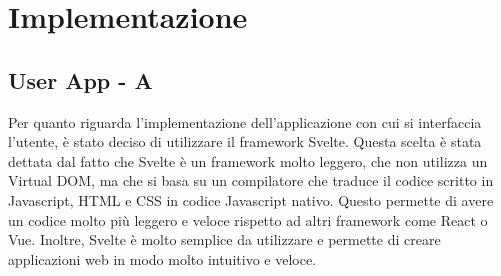 

\section{Implementazione}\label{sec:implementazione}


\subsection{User App - A}


Per quanto riguarda l'implementazione dell'applicazione con cui si interfaccia l'utente,
è stato deciso di utilizzare il framework Svelte. Questa scelta è stata dettata dal fatto
che Svelte è un framework molto leggero, che non utilizza un Virtual DOM, ma che si basa
su un compilatore che traduce il codice scritto in Javascript, HTML e CSS in codice Javascript
nativo. Questo permette di avere un codice molto più leggero e veloce rispetto ad altri
framework come React o Vue. Inoltre, Svelte è molto semplice da utilizzare e permette
di creare applicazioni web in modo molto intuitivo e veloce.


